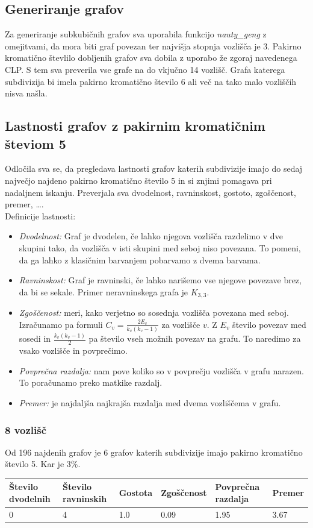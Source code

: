 \documentclass[11pt,a4paper,titlepage]{article}
\begin{document}
\subsection{Generiranje grafov}
Za generiranje subkubičnih grafov sva uporabila funkcijo \emph{nauty\_geng} z omejitvami, da mora biti graf povezan ter najvišja stopnja vozlišča je 3. Pakirno kromatično števlilo dobljenih grafov sva dobila z uporabo že zgoraj navedenega CLP. S tem sva preverila vse grafe na do vkjučno 14 vozlišč. Grafa katerega subdivizija bi imela pakirno kromatično število 6 ali več na tako malo vozliščih nisva našla.

\subsection{Lastnosti grafov z pakirnim kromatičnim števiom 5}
Odločila sva se, da pregledava lastnosti grafov katerih subdivizije imajo do sedaj največjo najdeno pakirno kromatično število 5 in si znjimi pomagava pri nadaljnem iskanju. Preverjala sva dvodelnost, ravninskost, gostoto, zgoščenost, premer, \dots.\\
Definicije lastnosti:
\begin{itemize}
	\item \emph{Dvodelnost:} Graf je dvodelen, če lahko njegova vozlišča razdelimo v dve skupini tako, da vozlišča v isti skupini med seboj niso povezana. To pomeni, da ga lahko z klasičnim barvanjem pobarvamo z dvema barvama.
	\item  \emph{Ravninskost:} Graf je ravninski, če lahko narišemo vse njegove povezave brez, da bi se sekale. Primer neravninskega grafa je $K_{3,3}$.
	\item  \emph{Zgoščenost:} meri, kako verjetno so sosednja vozlišča povezana med seboj. Izračunamo pa formuli $C_v = \frac{2E_v}{k_v(k_v-1)}$ za vozlišče $v$. Z $E_v$ število povezav med sosedi in $\frac{k_v(k_v-1)}{2}$ pa število vseh možnih povezav na grafu. To naredimo za vsako vozlišče in povprečimo.
	\item \emph{Povprečna razdalja:} nam pove koliko so v povprečju vozlišča v grafu narazen. To poračunamo preko matkike razdalj.
	\item  \emph{Premer:} je najdaljša najkrajša razdalja med dvema vozliščema v grafu. 
\end{itemize}



\subsubsection{8 vozlišč}
Od 196 najdenih grafov je 6 grafov katerih subdivizije imajo pakirno kromatično število 5. Kar je 3\%. 
\begin{table}[H]
	\begin{tabular}{|l|l|l|l|l|l|}
		\hline
		Število dvodelnih	& Število ravninskih  & Gostota  & Zgoščenost & Povprečna razdalja & Premer \\ \hline
		0 & 4 & 1.0 & 0.09 & 1.95 & 3.67  \\ \hline
	\end{tabular}
\end{table}
\end{document}
